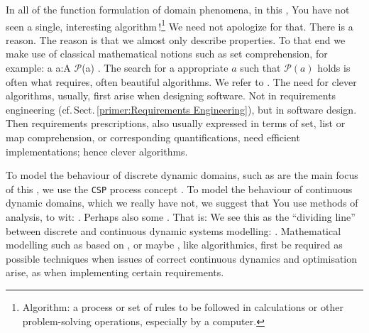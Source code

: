 \label{Role of Algorithms}

\begynd
\pind In all of the function formulation of domain phenomena, in this
\primer, You have 
      not seen a single, interesting algorithm\,!\footnote{\LLLL
        Algorithm: a process or set of rules to be followed in
        calculations or other problem-solving operations, especially
        by a computer.} 
\begynd
\pind We need not apologize for that.
\pind There is a reason.
\begynd
\pind The reason is that we almost only describe properties.
\pind To that end we make use of classical mathematical notions such as
      set comprehension, for example: \textsf{{\LBRACE}
      a {\BAR} a:A {\RDOT} $\mathcal{P}$(a) {\RBRACE}}.
\pind The search for a appropriate $a$ such that $\mathcal{P}(a)$
      holds is often what requires, often beautiful algorithms.
\afslut
\pind We refer to \cite[]{Knuth,Harel87b}.
\afslut
\mnewfoil
\pind The need for clever algorithms, usually, first arise when
      designing software. 
\begynd
\pind Not in requirements engineering
      (cf.\,Sect.\,\vref{primer:Requirements Engineering}), but in
      software design. 
\pind Then requirements prescriptions,
\begynd
\pind also usually expressed in terms of set, list or map comprehension, 
\pind or corresponding quantifications,
\afslut
\pind need efficient implementations;
\pind hence clever algorithms.
\afslut
\afslut

\label{CSP versus PDEs}

\begynd
\pind To model the behaviour of discrete dynamic domains, such as are
      the main focus of this \primer, we use the \texttt{CSP} process
      concept \citecsp.
\pind To model the behaviour of continuous dynamic domains, which we
      really have not, we suggest that You use  methods of
      analysis, to wit: .
\pind Perhaps also some  \cite{Zadeh1965Fuzzy,FuzzyTextBook2014}.   
\pind That is: We see this as the ``dividing line'' between discrete
      and continuous dynamic systems modelling: .
\pind Mathematical modelling such as based on  \cite{aastroem89}, 
      \cite{Karlin+Taylor1998} or maybe  \cite{Michel-etal-2010},
      like algorithmics, first be required 
      as possible techniques when issues of correct continuous
      dynamics and optimisation arise, as when implementing certain requirements. 
\afslut

